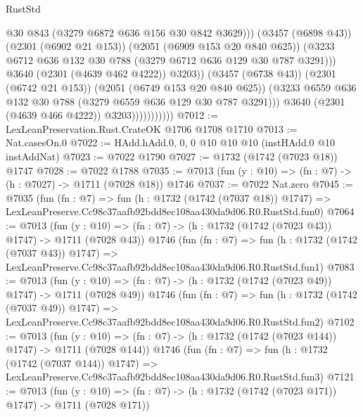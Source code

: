 \begin{lexlean}{RustStd}
\begin{coremodule}
                                      @30
                                      @843
                                      (@3279 @6872 @636 @156 @30 @842 @3629)))
                                  (@3457 (@6898 @43))
                                  (@2301 (@6902 @21 @153))
                                  (@2051 (@6909 @153 @20 @840 @625))
                                  (@3233
                                    @6712
                                    @636
                                    @132
                                    @30
                                    @788
                                    (@3279 @6712 @636 @129 @30 @787 @3291)))
                                @3640
                                (@2301 (@4639 @462 @4222))
                                @3203))
                            (@3457 (@6738 @43))
                            (@2301 (@6742 @21 @153))
                            (@2051 (@6749 @153 @20 @840 @625))
                            (@3233 @6559 @636 @132 @30 @788 (@3279 @6559 @636 @129 @30 @787 @3291)))
                          @3640
                          (@2301 (@4639 @466 @4222))
                          @3203)))))))))))
@7012 := LexLeanPreservation.Rust.CrateOK @1706 @1708 @1710
@7013 := Nat.casesOn.{0}
@7022 := HAdd.hAdd.{0, 0, 0} @10 @10 @10 (instHAdd.{0} @10 instAddNat)
@7023 := @7022 @1790
@7027 := @1732 (@1742 (@7023 @18)) @1747
@7028 := @7022 @1788
@7035 := @7013 (fun (y : @10) => (fn : @7) -> (h : @7027) -> @1711 (@7028 @18)) @1746
@7037 := @7022 Nat.zero
@7045 := @7035
    (fun (fn : @7) =>
    fun (h : @1732 (@1742 (@7037 @18)) @1747) =>
    LexLeanPreserve.Cc98c37aafb92bdd8ec108aa430da9d06.R0.RustStd.fun0)
@7064 := @7013
    (fun (y : @10) => (fn : @7) -> (h : @1732 (@1742 (@7023 @43)) @1747) -> @1711 (@7028 @43))
    @1746
    (fun (fn : @7) =>
    fun (h : @1732 (@1742 (@7037 @43)) @1747) =>
    LexLeanPreserve.Cc98c37aafb92bdd8ec108aa430da9d06.R0.RustStd.fun1)
@7083 := @7013
    (fun (y : @10) => (fn : @7) -> (h : @1732 (@1742 (@7023 @49)) @1747) -> @1711 (@7028 @49))
    @1746
    (fun (fn : @7) =>
    fun (h : @1732 (@1742 (@7037 @49)) @1747) =>
    LexLeanPreserve.Cc98c37aafb92bdd8ec108aa430da9d06.R0.RustStd.fun2)
@7102 := @7013
    (fun (y : @10) => (fn : @7) -> (h : @1732 (@1742 (@7023 @144)) @1747) -> @1711 (@7028 @144))
    @1746
    (fun (fn : @7) =>
    fun (h : @1732 (@1742 (@7037 @144)) @1747) =>
    LexLeanPreserve.Cc98c37aafb92bdd8ec108aa430da9d06.R0.RustStd.fun3)
@7121 := @7013
    (fun (y : @10) => (fn : @7) -> (h : @1732 (@1742 (@7023 @171)) @1747) -> @1711 (@7028 @171))

\end{coremodule}
\end{lexlean}
